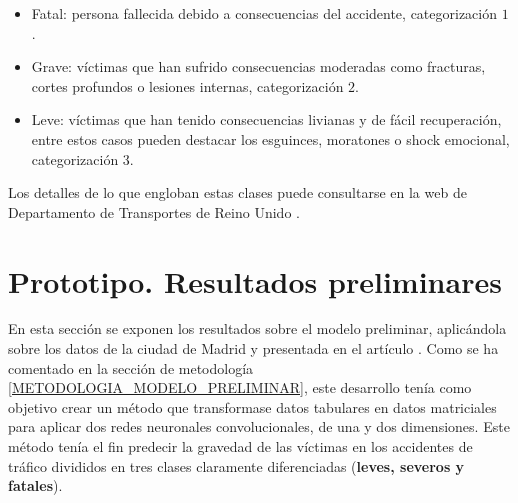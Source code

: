 \documentclass{uathesis-es}
\begin{document}
{		\begin{itemize}
			\item Fatal: persona fallecida debido a consecuencias del accidente, categorización $1$.
			\item Grave: víctimas que han sufrido consecuencias moderadas como fracturas, cortes profundos o lesiones internas, categorización $2$.
			\item Leve: víctimas que han tenido consecuencias livianas y de fácil recuperación, entre estos casos pueden destacar los esguinces, moratones o shock emocional, categorización $3$.
		\end{itemize}
		
		Los detalles de lo que engloban estas clases puede consultarse en la web de Departamento de Transportes de Reino Unido \cite{UKDepartmentSeverityDefinition}.
		
		
		
		\section{Prototipo. Resultados preliminares}
		
		
		
		
		
		
		En esta sección se exponen los resultados sobre el modelo preliminar, aplicándola sobre los datos de la ciudad de Madrid y presentada en el artículo \cite{PEREZSALA2023113245}. Como se ha comentado en la sección de metodología \ref{METODOLOGIA_MODELO_PRELIMINAR}, este desarrollo tenía como objetivo crear un método que transformase datos tabulares en datos matriciales para aplicar dos redes neuronales convolucionales, de una y dos dimensiones. Este método tenía el fin predecir la gravedad de las víctimas en los accidentes de tráfico divididos en tres clases claramente diferenciadas (\textbf{leves, severos y fatales}). 
		
}
\end{document}
